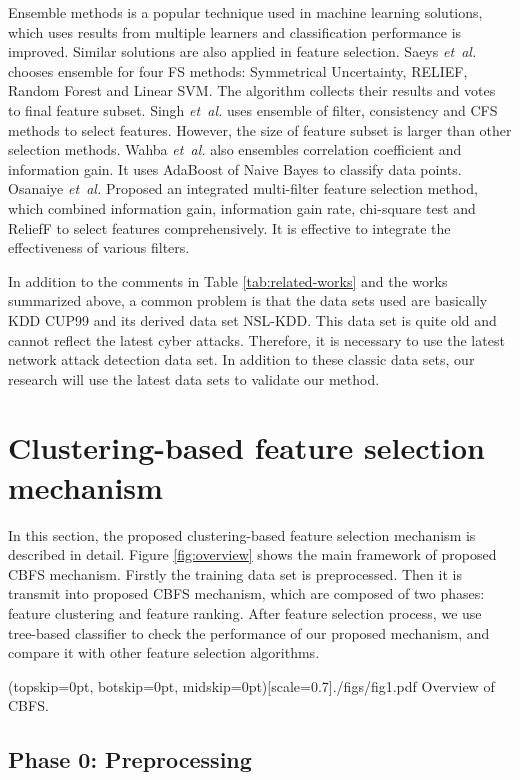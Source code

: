 \documentclass{ieeeaccess}
\theoremstyle{definition}
\begin{document}
Ensemble methods is a popular technique used in machine learning solutions, which uses results from multiple learners and classification performance is improved. Similar solutions are also applied in feature selection. 
Saeys \emph{et~al.} \cite{Saeys2008} chooses ensemble for four FS methods: Symmetrical Uncertainty, RELIEF, Random Forest and Linear SVM. The algorithm collects their results and votes to final feature subset.
Singh \emph{et~al.} \cite{Singh2015} uses ensemble of filter, consistency and CFS methods to select features. However, the size of feature subset is larger than other selection methods.
Wahba \emph{et~al.} \cite{Wahba2015} also ensembles correlation coefficient and information gain. It uses AdaBoost of Naive Bayes to classify data points. 
Osanaiye \emph{et~al.} \cite{Osanaiye2016} Proposed an integrated multi-filter feature selection method, which combined information gain, information gain rate, chi-square test and ReliefF to select features comprehensively. It is effective to integrate the effectiveness of various filters.

In addition to the comments in Table \ref{tab:related-works} and the works summarized above, a common problem is that the data sets used are basically KDD CUP99 and its derived data set NSL-KDD. This data set is quite old and cannot reflect the latest cyber attacks. Therefore, it is necessary to use the latest network attack detection data set. In addition to these classic data sets, our research will use the latest data sets to validate our method.

\section{Clustering-based feature selection mechanism}
\label{sec:method}

In this section, the proposed clustering-based feature selection mechanism is described in detail. Figure \ref{fig:overview} shows the main framework of proposed CBFS mechanism. Firstly the training data set is preprocessed. Then it is transmit into proposed CBFS mechanism, which are composed of two phases: feature clustering and feature ranking. After feature selection process, we use tree-based classifier to check the performance of our proposed mechanism, and compare it with other feature selection algorithms.

\Figure[!htpb](topskip=0pt, botskip=0pt, midskip=0pt)[scale=0.7]{./figs/fig1.pdf}
{Overview of CBFS. \label{fig:overview}}

\subsection{Phase 0: Preprocessing}
\end{document}
